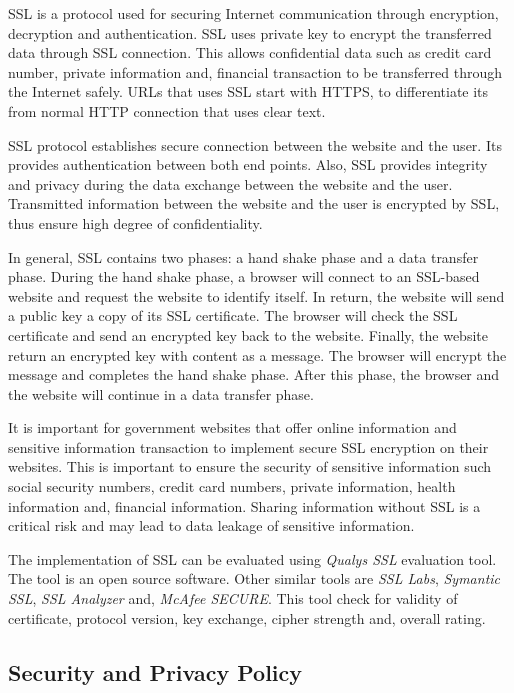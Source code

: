 \documentclass[conference]{IEEEtran}
\begin{document}
SSL is a protocol used for securing Internet communication through
encryption, decryption and authentication\cite{freier2011secure}. SSL
uses private key to encrypt the transferred data through SSL
connection. This allows confidential data such as credit card number,
private information and, financial transaction to be transferred
through the Internet safely. URLs that uses SSL start with HTTPS, to
differentiate its from normal HTTP connection that uses clear text.

SSL protocol establishes secure connection between the website and the
user. Its provides authentication between both end points. Also, SSL
provides integrity and privacy during the data exchange between the
website and the user\cite{alnatheer2014secure}. Transmitted
information between the website and the user is encrypted by SSL, thus
ensure high degree of confidentiality.

In general, SSL contains two phases: a hand shake phase and a data
transfer phase. During the hand shake phase, a browser will connect to
an SSL-based website and request the website to identify itself. In
return, the website will send a public key a copy of its SSL
certificate. The browser will check the SSL certificate and send an
encrypted key back to the website. Finally, the website return an
encrypted key with content as a message.  The browser will encrypt the
message and completes the hand shake phase. After this phase, the
browser and the website will continue in a data transfer phase.

It is important for government websites that offer online information
and sensitive information transaction to implement secure SSL
encryption on their websites. This is important to ensure the security
of sensitive information such social security numbers, credit card
numbers, private information, health information and, financial
information. Sharing information without SSL is a critical risk and
may lead to data leakage of sensitive information.

The implementation of SSL can be evaluated using \emph{Qualys SSL}
evaluation tool. The tool is an open source software. Other similar
tools are \emph{SSL Labs}, \emph{Symantic SSL}, \emph{SSL Analyzer}
and, \emph{McAfee SECURE}. This tool check for validity of
certificate, protocol version, key exchange, cipher strength and,
overall rating.

\subsection{Security and Privacy Policy}
\end{document}
